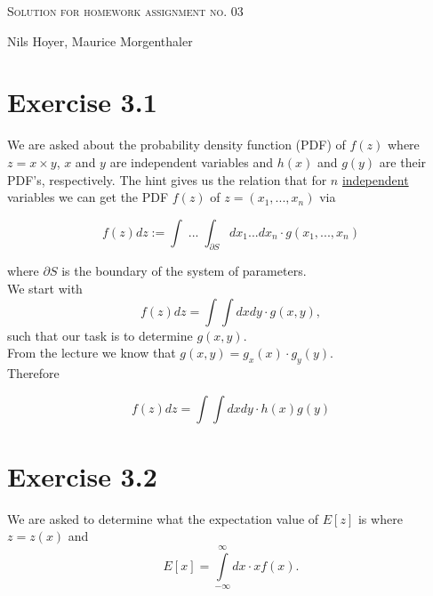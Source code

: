 \documentclass[10pt]{article}
\newenvironment{myfont}{\fontfamily{put}\selectfont}{\par}
\begin{document}
\begin{myfont}

\begin{center}
  \begin{Large}
    \textsc{Solution for homework assignment no. 03} \\
  \end{Large}
	\vspace*{0.4cm}
    Nils Hoyer, Maurice Morgenthaler
  \vspace*{1cm}
\end{center}

\section*{Exercise 3.1}

We are asked about the probability density function (PDF) of $f(z)$ where $z = x \times y$, $x$ and $y$ are independent variables and $h(x)$ and $g(y)$ are their PDF's, respectively.
The hint gives us the relation that for $n$ \underline{independent} variables we can get the PDF $f(z)$ of $z = (x_{1}, ..., x_{n})$ via

\begin{equation}
  f(z)dz := \int \; ... \; \int_{\partial S} dx_{1} ... dx_{n} \cdot g(x_{1}, ..., x_{n})
\end{equation}

\noindent where $\partial S$ is the boundary of the system of parameters. \\
We start with
$$
f(z)dz = \int\int dxdy \cdot g(x, y),
$$
\noindent such that our task is to determine $g(x, y)$. \\

\noindent From the lecture we know that $g(x, y) = g_{x}(x) \cdot g_{y}(y)$. \\
Therefore

\begin{equation}
  f(z)dz = \int\int dxdy \cdot h(x)g(y)
\end{equation}


\section*{Exercise 3.2}

We are asked to determine what the expectation value of $E[z]$ is where $z = z(x)$ and
\begin{equation}
  E[x] = \int\limits_{-\infty}^{\infty} dx \cdot xf(x).
\end{equation}


\end{myfont}
\end{document}
